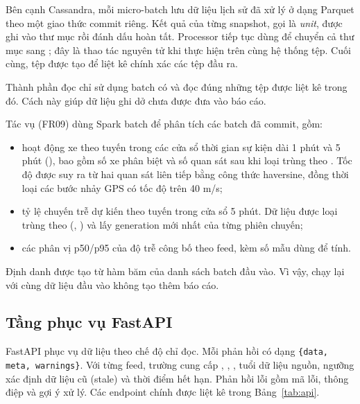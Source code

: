 Bên cạnh Cassandra, mỗi micro-batch lưu dữ liệu lịch sử đã xử lý ở dạng Parquet theo một giao thức commit riêng. Kết quả của từng snapshot, gọi là \textit{unit}, được ghi vào thư mục  rồi đánh dấu hoàn tất. Processor tiếp tục dùng  để chuyển cả thư mục sang ; đây là thao tác nguyên tử khi thực hiện trên cùng hệ thống tệp. Cuối cùng, tệp  được tạo để liệt kê chính xác các tệp đầu ra.

Thành phần đọc chỉ sử dụng batch có  và đọc đúng những tệp được liệt kê trong đó. Cách này giúp dữ liệu ghi dở chưa được đưa vào báo cáo.

Tác vụ  (FR09) dùng Spark batch để phân tích các batch đã commit, gồm:
\begin{itemize}
    \item hoạt động xe theo tuyến trong các cửa sổ thời gian sự kiện dài 1 phút và 5 phút (), bao gồm số xe phân biệt và số quan sát sau khi loại trùng theo . Tốc độ được suy ra từ hai quan sát liên tiếp bằng công thức haversine, đồng thời loại các bước nhảy GPS có tốc độ trên 40 m/s;
    \item tỷ lệ chuyến trễ dự kiến theo tuyến trong cửa sổ 5 phút. Dữ liệu được loại trùng theo (, ) và lấy generation mới nhất của từng phiên chuyến;
    \item các phân vị p50/p95 của độ trễ công bố theo feed, kèm số mẫu dùng để tính.
\end{itemize}
Định danh  được tạo từ hàm băm của danh sách batch đầu vào. Vì vậy, chạy lại với cùng dữ liệu đầu vào không tạo thêm báo cáo.

\subsection{Tầng phục vụ FastAPI}

FastAPI phục vụ dữ liệu theo chế độ chỉ đọc. Mỗi phản hồi có dạng \texttt{\{data, meta, warnings\}}. Với từng feed, trường  cung cấp , , , tuổi dữ liệu nguồn, ngưỡng xác định dữ liệu cũ (stale) và thời điểm hết hạn. Phản hồi lỗi gồm mã lỗi, thông điệp và gợi ý xử lý. Các endpoint chính được liệt kê trong Bảng~\ref{tab:api}.

